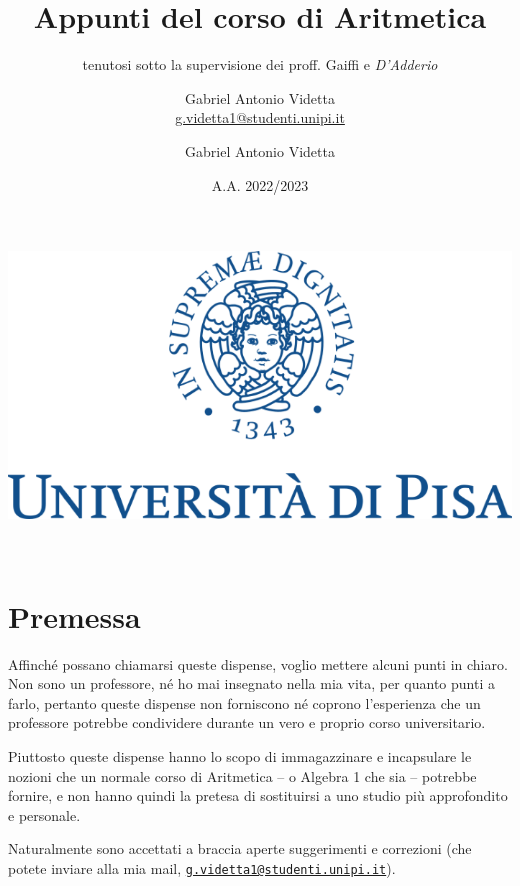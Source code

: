 \documentclass[11pt]{scrartcl}
\begin{document}
\author{Gabriel Antonio Videtta \\ \textnormal{\href{mailto:g.videtta1@studenti.unipi.it}{g.videtta1@studenti.unipi.it}}}
\title{Appunti del corso di Aritmetica}
\subtitle{tenutosi sotto la supervisione dei proff. Gaiffi e \textit{D'Adderio}}
\date{A.A. 2022/2023}
\maketitle
\thispagestyle{empty}

\begin{center}
	\includegraphics[scale=0.3]{logo.png}
\end{center}

\author{Gabriel Antonio Videtta}
\newpage
\thispagestyle{empty}
~\newpage

\section*{Premessa}

Affinché possano chiamarsi queste dispense, voglio mettere alcuni punti
in chiaro. Non sono un professore, né ho mai insegnato nella mia vita, per
quanto punti a farlo, pertanto queste dispense non forniscono né coprono
l'esperienza che un professore potrebbe condividere durante un vero e proprio
corso universitario.

Piuttosto queste dispense hanno lo scopo di immagazzinare e incapsulare
le nozioni che un normale corso di Aritmetica -- o Algebra 1 che sia --
potrebbe fornire, e non hanno quindi la pretesa di sostituirsi a uno
studio più approfondito e personale.

Naturalmente sono accettati a braccia aperte suggerimenti e correzioni
(che potete inviare alla mia mail,
\texttt{\href{mailto:g.videtta1@studenti.unipi.it}{g.videtta1@studenti.unipi.it}}).
\end{document}
